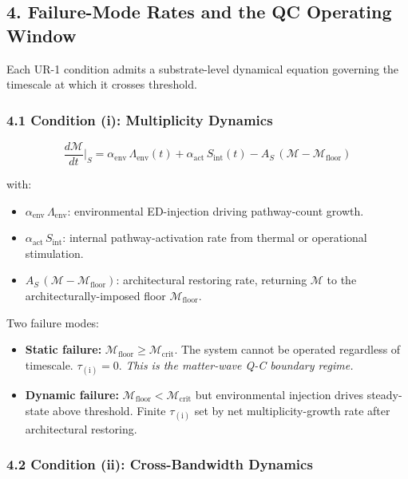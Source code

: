 \documentclass[
  11pt,
  a4paper,
]{article}
\providecommand{\tightlist}{%
  \setlength{\itemsep}{0pt}\setlength{\parskip}{0pt}}
\begin{document}
\subsection{4. Failure-Mode Rates and the QC Operating
Window}\label{failure-mode-rates-and-the-qc-operating-window}

Each UR-1 condition admits a substrate-level dynamical equation
governing the timescale at which it crosses threshold.

\subsubsection{4.1 Condition (i): Multiplicity
Dynamics}\label{condition-i-multiplicity-dynamics}

\[
\frac{d\mathcal{M}}{dt}\bigg|_{S} = \alpha_{\mathrm{env}}\,\Lambda_{\mathrm{env}}(t) + \alpha_{\mathrm{act}}\,S_{\mathrm{int}}(t) - A_{S}\,(\mathcal{M} - \mathcal{M}_{\mathrm{floor}})
\]

with:

\begin{itemize}
\tightlist
\item
  \(\alpha_{\mathrm{env}}\,\Lambda_{\mathrm{env}}\): environmental
  ED-injection driving pathway-count growth.
\item
  \(\alpha_{\mathrm{act}}\,S_{\mathrm{int}}\): internal
  pathway-activation rate from thermal or operational stimulation.
\item
  \(A_{S}\,(\mathcal{M} - \mathcal{M}_{\mathrm{floor}})\): architectural
  restoring rate, returning \(\mathcal{M}\) to the
  architecturally-imposed floor \(\mathcal{M}_{\mathrm{floor}}\).
\end{itemize}

Two failure modes:

\begin{itemize}
\tightlist
\item
  \textbf{Static failure:}
  \(\mathcal{M}_{\mathrm{floor}} \geq \mathcal{M}_{\mathrm{crit}}\). The
  system cannot be operated regardless of timescale.
  \(\tau_{(\mathrm{i})} = 0\). \emph{This is the matter-wave Q-C
  boundary regime.}
\item
  \textbf{Dynamic failure:}
  \(\mathcal{M}_{\mathrm{floor}} < \mathcal{M}_{\mathrm{crit}}\) but
  environmental injection drives steady-state above threshold. Finite
  \(\tau_{(\mathrm{i})}\) set by net multiplicity-growth rate after
  architectural restoring.
\end{itemize}

\subsubsection{4.2 Condition (ii): Cross-Bandwidth
Dynamics}\label{condition-ii-cross-bandwidth-dynamics}
\end{document}
